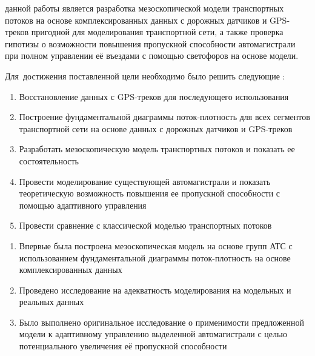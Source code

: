 \ifsynopsis

\else

\fi


{\aim} данной работы является разработка мезоскопической модели транспортных потоков на основе комплексированных данных с дорожных датчиков и GPS-треков пригодной для моделирования транспортной сети, а также проверка гипотизы о возможности повышения пропускной способности автомагистрали при полном управлении её въездами с помощью светофоров на основе модели.

Для~достижения поставленной цели необходимо было решить следующие {\tasks}:
\begin{enumerate}[beginpenalty=10000] %
  \item Восстановление данных с GPS-треков для последующего использования
  \item Построение фундаментальной диаграммы поток-плотность для всех сегментов транспортной сети на основе данных с дорожных датчиков и GPS-треков
  \item Разработать мезоскопическую модель транспортных потоков и показать ее состоятельность
  \item Провести моделирование существующей автомагистрали и показать теоретическую возможность повышения ее пропускной способности с помощью адаптивного управления
  \item Провести сравнение с классической моделью транспортных потоков
\end{enumerate}


{\novelty}
\begin{enumerate}[beginpenalty=10000] %
  \item Впервые была построена мезоскопическая модель на основе групп АТС с использованием фундаментальной диаграммы поток-плотность на основе комплексированных данных
  \item Проведено исследование на адекватность моделирования на модельных и реальных данных
  \item Было выполнено оригинальное исследование о применимости предложенной модели к адаптивному управлению выделенной автомагистрали с целью потенциального увеличения её пропускной способности
\end{enumerate}


